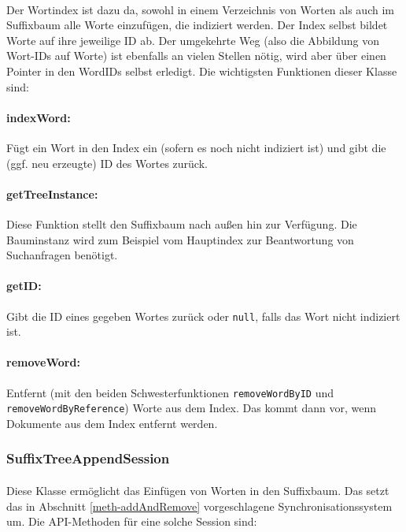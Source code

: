 \paragraph{} Der Wortindex ist dazu da, sowohl in einem Verzeichnis von Worten als auch im Suffixbaum alle Worte einzufügen, die indiziert werden. Der Index selbst bildet Worte auf ihre jeweilige ID ab. Der umgekehrte Weg (also die Abbildung von Wort-IDs auf Worte) ist ebenfalls an vielen Stellen nötig, wird aber über einen Pointer in den WordIDs selbst erledigt. Die wichtigsten Funktionen dieser Klasse sind:

\paragraph{indexWord:} Fügt ein Wort in den Index ein (sofern es noch nicht indiziert ist) und gibt die (ggf. neu erzeugte) ID des Wortes zurück.

\paragraph{getTreeInstance:} Diese Funktion stellt den Suffixbaum nach außen hin zur Verfügung. Die Bauminstanz wird zum Beispiel vom Hauptindex zur Beantwortung von Suchanfragen benötigt.

\paragraph{getID:} Gibt die ID eines gegeben Wortes zurück oder \texttt{null}, falls das Wort nicht indiziert ist.

\paragraph{removeWord:} Entfernt (mit den beiden Schwesterfunktionen \texttt{removeWordByID} und \texttt{removeWordByReference}) Worte aus dem Index. Das kommt dann vor, wenn Dokumente aus dem Index entfernt werden.

\subsubsection{SuffixTreeAppendSession}
\label{arch-session}

\paragraph{} Diese Klasse ermöglicht das Einfügen von Worten in den Suffixbaum. Das setzt das in Abschnitt \ref{meth-addAndRemove} vorgeschlagene Synchronisationssystem um. Die API-Methoden für eine solche Session sind:

